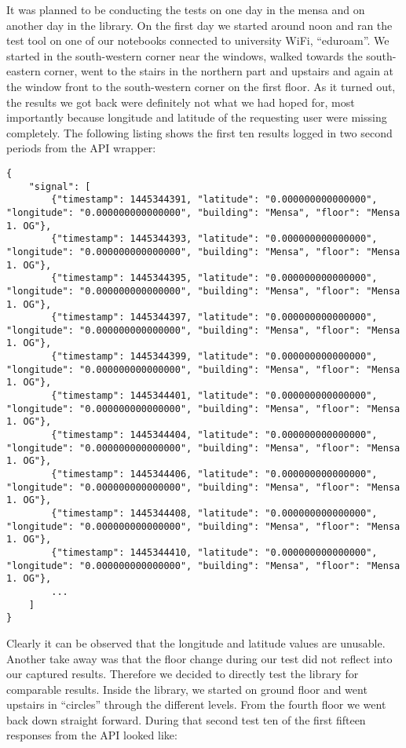 It was planned to be conducting the tests on one day in the mensa and on another day in the library. On the first day we started around noon and ran the test tool on one of our notebooks connected to university WiFi, \enquote{eduroam}. We started in the south-western corner near the windows, walked towards the south-eastern corner, went to the stairs in the northern part and upstairs and again at the window front to the south-western corner on the first floor. As it turned out, the results we got back were definitely not what we had hoped for, most importantly because longitude and latitude of the requesting user were missing completely. The following listing shows the first ten results logged in two second periods from the API wrapper:

\begin{lstlisting}
{
    "signal": [
        {"timestamp": 1445344391, "latitude": "0.000000000000000", "longitude": "0.000000000000000", "building": "Mensa", "floor": "Mensa 1. OG"},
        {"timestamp": 1445344393, "latitude": "0.000000000000000", "longitude": "0.000000000000000", "building": "Mensa", "floor": "Mensa 1. OG"},
        {"timestamp": 1445344395, "latitude": "0.000000000000000", "longitude": "0.000000000000000", "building": "Mensa", "floor": "Mensa 1. OG"},
        {"timestamp": 1445344397, "latitude": "0.000000000000000", "longitude": "0.000000000000000", "building": "Mensa", "floor": "Mensa 1. OG"},
        {"timestamp": 1445344399, "latitude": "0.000000000000000", "longitude": "0.000000000000000", "building": "Mensa", "floor": "Mensa 1. OG"},
        {"timestamp": 1445344401, "latitude": "0.000000000000000", "longitude": "0.000000000000000", "building": "Mensa", "floor": "Mensa 1. OG"},
        {"timestamp": 1445344404, "latitude": "0.000000000000000", "longitude": "0.000000000000000", "building": "Mensa", "floor": "Mensa 1. OG"},
        {"timestamp": 1445344406, "latitude": "0.000000000000000", "longitude": "0.000000000000000", "building": "Mensa", "floor": "Mensa 1. OG"},
        {"timestamp": 1445344408, "latitude": "0.000000000000000", "longitude": "0.000000000000000", "building": "Mensa", "floor": "Mensa 1. OG"},
        {"timestamp": 1445344410, "latitude": "0.000000000000000", "longitude": "0.000000000000000", "building": "Mensa", "floor": "Mensa 1. OG"},
        ...
    ]
}
\end{lstlisting}

Clearly it can be observed that the longitude and latitude values are unusable. Another take away was that the floor change during our test did not reflect into our captured results. Therefore we decided to directly test the library for comparable results. Inside the library, we started on ground floor and went upstairs in \enquote{circles} through the different levels. From the fourth floor we went back down straight forward. During that second test ten of the first fifteen responses from the API looked like:

